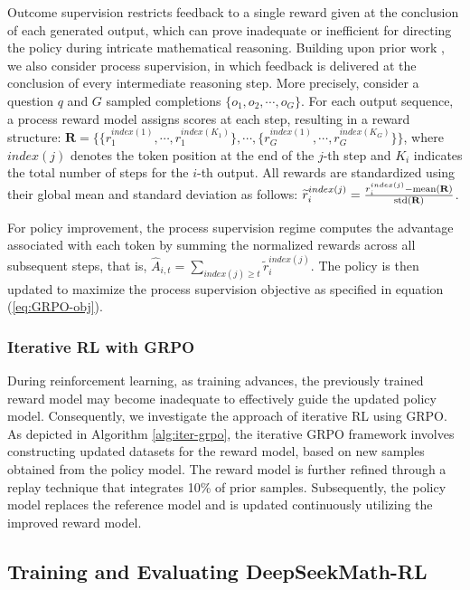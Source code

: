 \begin{itemize}[topsep=0pt]
\begin{itemize}[topsep=0pt]
Outcome supervision restricts feedback to a single reward given at the conclusion of each generated output, which can prove inadequate or inefficient for directing the policy during intricate mathematical reasoning. Building upon prior work \cite{wang2023math}, we also consider process supervision, in which feedback is delivered at the conclusion of every intermediate reasoning step. More precisely, consider a question $q$ and $G$ sampled completions $\{o_1, o_2, \cdots, o_G\}$. For each output sequence, a process reward model assigns scores at each step, resulting in a reward structure: $\mathbf{R} = \{ \{r_1^{index(1)},\cdots,r_1^{index(K_1)}\}, \cdots,  \{r_G^{index(1)},\cdots,r_G^{index(K_G)}\} \}$, where $index(j)$ denotes the token position at the end of the $j$-th step and $K_i$ indicates the total number of steps for the $i$-th output. All rewards are standardized using their global mean and standard deviation as follows: $\widetilde{r}_i^{index(j)} = \frac{r_i^{index(j)} - {\rm mean(\mathbf{R})}}{{\rm std(\mathbf{R})}}$.

For policy improvement, the process supervision regime computes the advantage associated with each token by summing the normalized rewards across all subsequent steps, that is, $\hat{A}_{i, t} = \sum_{index(j) \ge t} \widetilde{r}_i^{index(j)}$. The policy is then updated to maximize the process supervision objective as specified in equation (\ref{eq:GRPO-obj}).

\subsubsection{Iterative RL with GRPO} During reinforcement learning, as training advances, the previously trained reward model may become inadequate to effectively guide the updated policy model. Consequently, we investigate the approach of iterative RL using GRPO. As depicted in Algorithm \ref{alg:iter-grpo}, the iterative GRPO framework involves constructing updated datasets for the reward model, based on new samples obtained from the policy model. The reward model is further refined through a replay technique that integrates 10\% of prior samples. Subsequently, the policy model replaces the reference model and is updated continuously utilizing the improved reward model.

\subsection{Training and Evaluating DeepSeekMath-RL}


\end{itemize}
\end{itemize}
